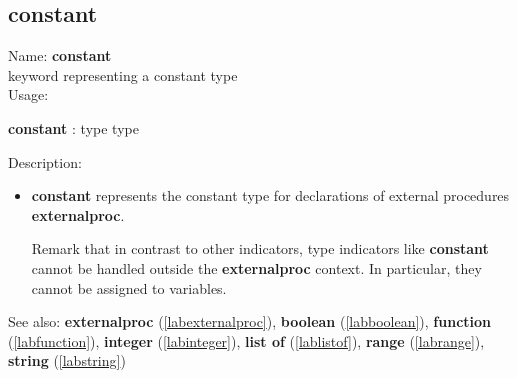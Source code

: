 \subsection{constant}
\label{labconstant}
\noindent Name: \textbf{constant}\\
keyword representing a \textsf{constant} type \\
\noindent Usage: 
\begin{center}
\textbf{constant} : \textsf{type type}
\\ 
\end{center}
\noindent Description: \begin{itemize}

\item \textbf{constant} represents the \textsf{constant} type for declarations
   of external procedures \textbf{externalproc}.
    
   Remark that in contrast to other indicators, type indicators like
   \textbf{constant} cannot be handled outside the \textbf{externalproc} context.  In
   particular, they cannot be assigned to variables.
\end{itemize}
See also: \textbf{externalproc} (\ref{labexternalproc}), \textbf{boolean} (\ref{labboolean}), \textbf{function} (\ref{labfunction}), \textbf{integer} (\ref{labinteger}), \textbf{list of} (\ref{lablistof}), \textbf{range} (\ref{labrange}), \textbf{string} (\ref{labstring})

